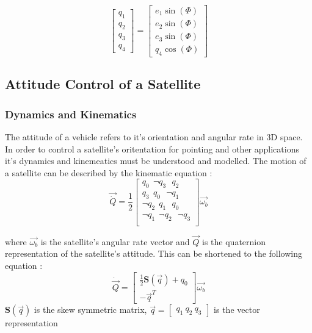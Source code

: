 \begin{equation}
    \begin{bmatrix}
        q_{1} \\ q_{2} \\ q_{3} \\ q_{4}
    \end{bmatrix}
    =
    \begin{bmatrix}
        e_{1}\sin(\Phi) \\ e_{2}\sin(\Phi) \\ e_{3}\sin(\Phi) \\ q_{4}\cos(\Phi)
    \end{bmatrix}
\end{equation}



\subsection{Attitude Control of a Satellite}
\subsubsection{Dynamics and Kinematics}
The attitude of a vehicle refers to it's orientation and angular rate in 3D space. In order to control a satellite's oritentation for pointing and other applications it's dynamics and kinemeatics must be understood and modelled. The motion of a satellite can be described by the kinematic equation \cite{sidiAttitudeDynamicsKinematics1997}:
\begin{equation}
    \vec{\dot{Q}}
=\frac{1}{2}
\begin{bmatrix}
q_{0} \ \ \neg q_{3} \ \ \ q_{2} \\ 
q_{3} \ \ q_{0} \ \ \ \neg q_{1} \\ 
\neg q_{2} \ \ q_{1} \ \ \ q_{0} \\ 
\neg q_{1} \ \ \neg q_{2} \ \ \ \neg q_{3} \\
\end{bmatrix} \vec{\omega_{b}}
\end{equation}

where $\vec{\omega_{b}}$ is the satellite's angular rate vector and $\vec{Q}$ is the quaternion representation of the satellite's attitude. This can be shortened to the following equation \cite{shenActiveFaulttolerantControl2019}:
\begin{equation}
    \dot{\vec{Q}} = 
    \begin{bmatrix}
        \frac{1}{2}\mathbf{S}(\vec{q})+q_{0} \\
        -\vec{q}^T
    \end{bmatrix}
    \vec{\omega_{b}}
\end{equation}
$\mathbf{S}(\vec{q})$ is the skew symmetric matrix, $\vec{q}=\begin{bmatrix}q_{1} \ q_{2} \ q_{3} \end{bmatrix}$ is the vector representation


